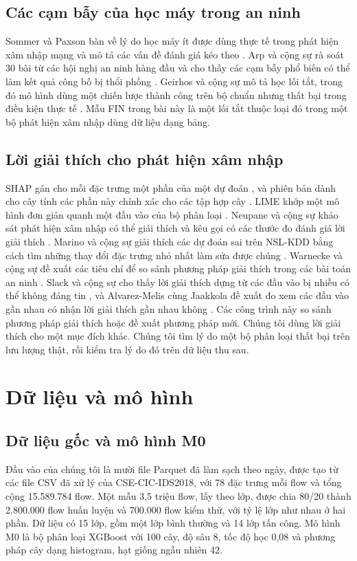 \documentclass[conference]{IEEEtran}
\begin{document}
\subsection{Các cạm bẫy của học máy trong an ninh}
Sommer và Paxson bàn về lý do học máy ít được dùng thực tế trong phát hiện xâm nhập mạng và mô tả các vấn đề đánh giá kéo theo \cite{sommer2010}. Arp và cộng sự rà soát 30 bài từ các hội nghị an ninh hàng đầu và cho thấy các cạm bẫy phổ biến có thể làm kết quả công bố bị thổi phồng \cite{arp2022}. Geirhos và cộng sự mô tả học lối tắt, trong đó mô hình dùng một chiến lược thành công trên bộ chuẩn nhưng thất bại trong điều kiện thực tế \cite{geirhos2020}. Mẫu FIN trong bài này là một lối tắt thuộc loại đó trong một bộ phát hiện xâm nhập dùng dữ liệu dạng bảng.

\subsection{Lời giải thích cho phát hiện xâm nhập}
SHAP gán cho mỗi đặc trưng một phần của một dự đoán \cite{lundberg2017}, và phiên bản dành cho cây tính các phần này chính xác cho các tập hợp cây \cite{lundberg2020}. LIME khớp một mô hình đơn giản quanh một đầu vào của bộ phân loại \cite{ribeiro2016}. Neupane và cộng sự khảo sát phát hiện xâm nhập có thể giải thích và kêu gọi có các thước đo đánh giá lời giải thích \cite{neupane2022}. Marino và cộng sự giải thích các dự đoán sai trên NSL-KDD bằng cách tìm những thay đổi đặc trưng nhỏ nhất làm sửa được chúng \cite{marino2018}. Warnecke và cộng sự đề xuất các tiêu chí để so sánh phương pháp giải thích trong các bài toán an ninh \cite{warnecke2020}. Slack và cộng sự cho thấy lời giải thích dựng từ các đầu vào bị nhiễu có thể không đáng tin \cite{slack2019}, và Alvarez-Melis cùng Jaakkola đề xuất đo xem các đầu vào gần nhau có nhận lời giải thích gần nhau không \cite{alvarezmelis2018}. Các công trình này so sánh phương pháp giải thích hoặc đề xuất phương pháp mới. Chúng tôi dùng lời giải thích cho một mục đích khác. Chúng tôi tìm lý do một bộ phân loại thất bại trên lưu lượng thật, rồi kiểm tra lý do đó trên dữ liệu thu sau.

\section{Dữ liệu và mô hình}
\subsection{Dữ liệu gốc và mô hình M0}
\label{sec:m0}
Đầu vào của chúng tôi là mười file Parquet đã làm sạch theo ngày, được tạo từ các file CSV đã xử lý của CSE-CIC-IDS2018, với 78 đặc trưng mỗi flow và tổng cộng 15.589.784 flow. Một mẫu 3,5 triệu flow, lấy theo lớp, được chia 80/20 thành 2.800.000 flow huấn luyện và 700.000 flow kiểm thử, với tỷ lệ lớp như nhau ở hai phần. Dữ liệu có 15 lớp, gồm một lớp bình thường và 14 lớp tấn công. Mô hình M0 là bộ phân loại XGBoost với 100 cây, độ sâu 8, tốc độ học 0,08 và phương pháp cây dạng histogram, hạt giống ngẫu nhiên 42.
\end{document}

